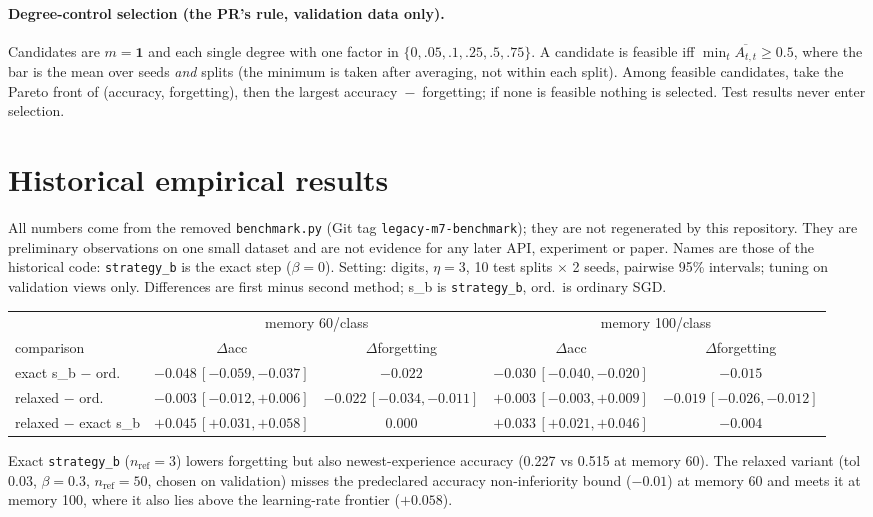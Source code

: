 \documentclass[11pt,a4paper]{article}
\theoremstyle{remark}\newtheorem*{rem}{Remark}
\begin{document}
\paragraph{Degree-control selection (the PR's rule, validation data only).} Candidates are $m=\mathbf1$ and each
single degree with one factor in $\{0,.05,.1,.25,.5,.75\}$. A candidate is feasible iff
$\min_t\overline{A_{t,t}}\ge 0.5$, where the bar is the mean over seeds \emph{and} splits (the minimum is taken after averaging, not within each split). Among feasible
candidates, take the Pareto front of (accuracy, forgetting), then the largest accuracy~$-$~forgetting;
if none is feasible nothing is selected. Test results never enter selection.

\section{Historical empirical results}\label{s:emp}
All numbers come from the removed \texttt{benchmark.py} (Git tag \texttt{legacy-m7-benchmark}); they are not
regenerated by this repository. They are preliminary observations on one small dataset and are not evidence
for any later API, experiment or paper. Names are those of the historical code: \texttt{strategy\_b} is the exact
step ($\beta=0$). Setting: digits, $\eta=3$, 10 test splits $\times$ 2 seeds, pairwise
95\% intervals; tuning on validation views only. Differences are first minus second method; s\_b is \texttt{strategy\_b}, ord.\ is ordinary SGD.
\begin{center}\scriptsize\setlength{\tabcolsep}{3pt}\begin{tabular}{@{}lcccc@{}}\toprule
 & \multicolumn{2}{c}{memory 60/class} & \multicolumn{2}{c}{memory 100/class}\\
comparison & $\Delta$acc & $\Delta$forgetting & $\Delta$acc & $\Delta$forgetting\\\midrule
exact s\_b $-$ ord. & $-0.048\,[-0.059,-0.037]$ & $-0.022$ & $-0.030\,[-0.040,-0.020]$ & $-0.015$\\
relaxed $-$ ord. & $-0.003\,[-0.012,+0.006]$ & $-0.022\,[-0.034,-0.011]$ & $+0.003\,[-0.003,+0.009]$ & $-0.019\,[-0.026,-0.012]$\\
relaxed $-$ exact s\_b & $+0.045\,[+0.031,+0.058]$ & $0.000$ & $+0.033\,[+0.021,+0.046]$ & $-0.004$\\\bottomrule
\end{tabular}\end{center}
Exact \texttt{strategy\_b} ($n_{\text{ref}}=3$) lowers forgetting but also newest-experience accuracy
(0.227 vs 0.515 at memory 60). The relaxed variant (tol $0.03$, $\beta=0.3$, $n_{\text{ref}}=50$, chosen on
validation) misses the predeclared accuracy non-inferiority bound ($-0.01$) at memory 60 and meets it at
memory 100, where it also lies above the learning-rate frontier ($+0.058$).
\end{document}
